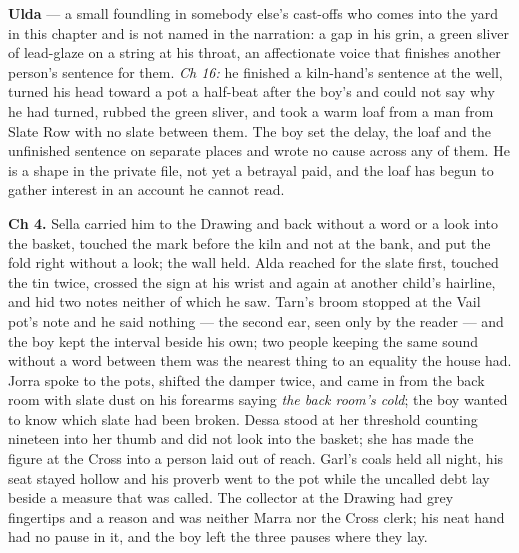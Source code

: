 \documentclass{design/chronicle}
\begin{document}
{\textbf{Ulda} — a small foundling in somebody else’s cast-offs who comes into the yard in this chapter and is not named in the narration: a gap in his grin, a green sliver of lead-glaze on a string at his throat, an affectionate voice that finishes another person’s sentence for them. \emph{Ch 16:} he finished a kiln-hand’s sentence at the well, turned his head toward a pot a half-beat after the boy’s and could not say why he had turned, rubbed the green sliver, and took a warm loaf from a man from Slate Row with no slate between them. The boy set the delay, the loaf and the unfinished sentence on separate places and wrote no cause across any of them. He is a shape in the private file, not yet a betrayal paid, and the loaf has begun to gather interest in an account he cannot read.

\textbf{Ch 4.} Sella carried him to the Drawing and back without a word or a look into the basket, touched the mark before the kiln and not at the bank, and put the fold right without a look; the wall held. Alda reached for the slate first, touched the tin twice, crossed the sign at his wrist and again at another child’s hairline, and hid two notes neither of which he saw. Tarn’s broom stopped at the Vail pot’s note and he said nothing --- the second ear, seen only by the reader --- and the boy kept the interval beside his own; two people keeping the same sound without a word between them was the nearest thing to an equality the house had. Jorra spoke to the pots, shifted the damper twice, and came in from the back room with slate dust on his forearms saying \emph{the back room’s cold}; the boy wanted to know which slate had been broken. Dessa stood at her threshold counting nineteen into her thumb and did not look into the basket; she has made the figure at the Cross into a person laid out of reach. Garl’s coals held all night, his seat stayed hollow and his proverb went to the pot while the uncalled debt lay beside a measure that was called. The collector at the Drawing had grey fingertips and a reason and was neither Marra nor the Cross clerk; his neat hand had no pause in it, and the boy left the three pauses where they lay.

}
\end{document}
